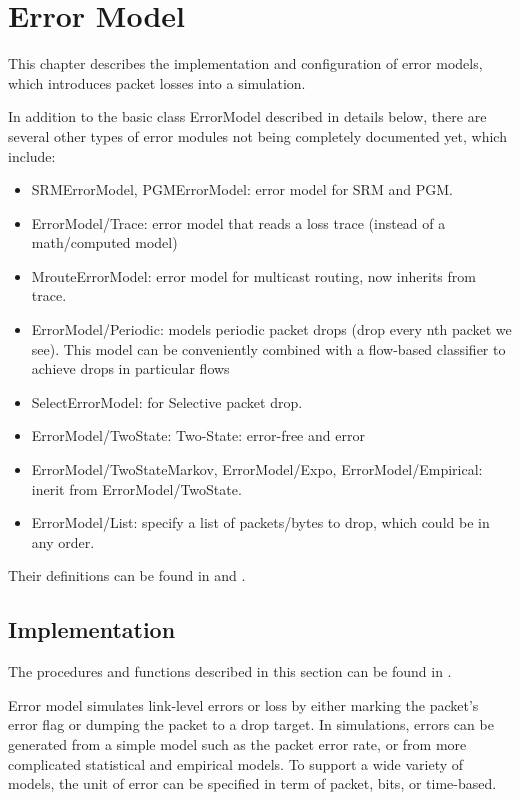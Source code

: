 %
%
\chapter{Error Model}
\label{chap:error_model}

This chapter describes the implementation and configuration of error
models, which introduces packet losses into a simulation. 

In addition to the basic class ErrorModel described in details below, 
  there are several other types of error modules not being 
  completely documented yet,
  which include:
  \begin{itemize}
    \item SRMErrorModel, PGMErrorModel: 
      error model for SRM and PGM.
    \item ErrorModel/Trace: 
      error model that reads a loss trace (instead of a math/computed model)
    \item MrouteErrorModel:
      error model for multicast routing, now inherits from trace.
    \item ErrorModel/Periodic:
      models periodic packet drops (drop every nth packet we see).
      This model can be conveniently combined with a flow-based classifier
      to achieve drops in particular flows
    \item SelectErrorModel:
       for Selective packet drop.
    \item ErrorModel/TwoState:
      Two-State:  error-free and error
    \item ErrorModel/TwoStateMarkov, ErrorModel/Expo, ErrorModel/Empirical:
      inerit from ErrorModel/TwoState.
    \item ErrorModel/List:
      specify a list of packets/bytes to drop,
      which could be in any order.
  \end{itemize}

Their definitions can be found in  and
 .

\section{Implementation}

The procedures and functions described in this section can be found in
.

Error model simulates link-level errors or loss by either marking the
packet's error flag or dumping the packet to a drop target.  In
simulations, errors can be generated from a simple model such as the
packet error rate, or from more complicated statistical and empirical models.
To support a wide variety of models, the unit of error can be specified
in term of packet, bits, or time-based.

